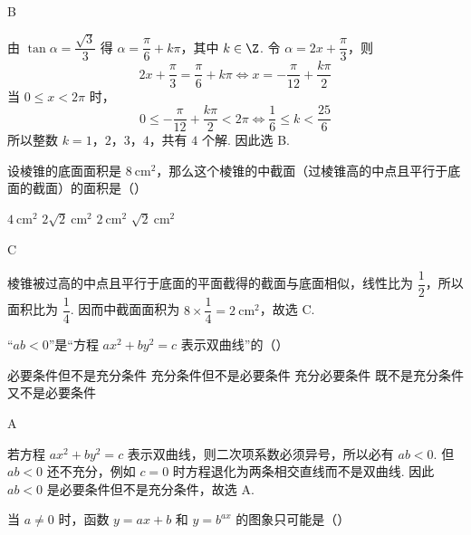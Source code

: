 \documentclass[UTF8,a4paper,oneside,11pt]{ctexbook}
\begin{document}
\begin{answer}
B
\end{answer}

\begin{solution}
由 \(\tan\alpha=\dfrac{\sqrt3}{3}\) 得 \(\alpha=\dfrac{\pi}{6}+k\pi\)，其中 \(k\in\Z\). 令 \(\alpha=2x+\dfrac{\pi}{3}\)，则
\[
2x+\frac{\pi}{3}=\frac{\pi}{6}+k\pi
\iff x=-\frac{\pi}{12}+\frac{k\pi}{2}
\]
当 \(0\leqslant x<2\pi\) 时，
\[
0\leqslant-\frac{\pi}{12}+\frac{k\pi}{2}<2\pi
\iff \frac16\leqslant k<\frac{25}{6}
\]
所以整数 \(k=1\)，\(2\)，\(3\)，\(4\)，共有 \(4\) 个解. 因此选 B.
\end{solution}

\begin{problem}
设棱锥的底面面积是 \(8\mathrm{~cm}^2\)，那么这个棱锥的中截面（过棱锥高的中点且平行于底面的截面）的面积是（\quad）

\choices
    {\(4\mathrm{~cm}^2\)}
    {\(2\sqrt{2}\mathrm{~cm}^2\)}
    {\(2\mathrm{~cm}^2\)}
    {\(\sqrt{2}\mathrm{~cm}^2\)}
\end{problem}

\begin{answer}
C
\end{answer}

\begin{solution}
棱锥被过高的中点且平行于底面的平面截得的截面与底面相似，线性比为 \(\dfrac{1}{2}\)，所以面积比为 \(\dfrac{1}{4}\). 因而中截面面积为 \(8\times\dfrac14=2\mathrm{~cm}^2\)，故选 C.
\end{solution}

\begin{problem}
“\(ab<0\)”是“方程 \(ax^2+by^2=c\) 表示双曲线”的（\quad）

\choices
    {必要条件但不是充分条件}
    {充分条件但不是必要条件}
    {充分必要条件}
    {既不是充分条件又不是必要条件}
\end{problem}

\begin{answer}
A
\end{answer}

\begin{solution}
若方程 \(ax^2+by^2=c\) 表示双曲线，则二次项系数必须异号，所以必有 \(ab<0\). 但 \(ab<0\) 还不充分，例如 \(c=0\) 时方程退化为两条相交直线而不是双曲线. 因此 \(ab<0\) 是必要条件但不是充分条件，故选 A.
\end{solution}

\begin{problem}
当 \(a\neq 0\) 时，函数 \(y=ax+b\) 和 \(y=b^{ax}\) 的图象只可能是（\quad）

\choices
    {}
    {}
    {}
    {}
\end{problem}
\end{document}
